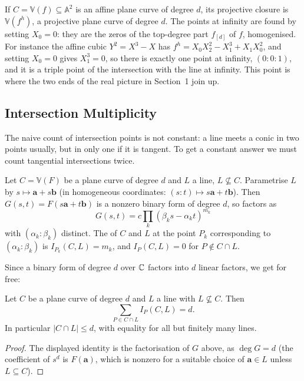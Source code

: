 \documentclass[a4paper]{scrartcl}
\newcommand{\A}{\mathbb{A}}
\newcommand{\V}{\mathbb{V}}
\begin{document}
\begin{example}
	If $C = \V(f) \subseteq \A^2$ is an affine plane curve of degree $d$, its projective closure is $\V(f^h)$, a projective plane curve of degree $d$. The points at infinity are found by setting $X_0 = 0$: they are the zeros of the top-degree part $f_{[d]}$ of $f$, homogenised. For instance the affine cubic $Y^2 = X^3 - X$ has $f^h = X_0X_2^2 - X_1^3 + X_1X_0^2$, and setting $X_0 = 0$ gives $X_1^3 = 0$, so there is exactly one point at infinity, $(0:0:1)$, and it is a triple point of the intersection with the line at infinity. This point is where the two ends of the real picture in Section~1 join up.
\end{example}

\subsection{Intersection Multiplicity}

The naive count of intersection points is not constant: a line meets a conic in two points usually, but in only one if it is tangent. To get a constant answer we must count tangential intersections twice.

\begin{definition}
	Let $C = \V(F)$ be a plane curve of degree $d$ and $L$ a line, $L \not\subseteq C$. Parametrise $L$ by $s \mapsto \mathbf a + s\mathbf b$ (in homogeneous coordinates: $(s:t)\mapsto s\mathbf a + t \mathbf b$). Then $G(s,t) = F(s\mathbf a + t\mathbf b)$ is a nonzero binary form of degree $d$, so factors as
	$$G(s,t) = c\prod_{k}(\beta_k s - \alpha_k t)^{m_k}$$
	with $(\alpha_k:\beta_k)$ distinct. The  of $C$ and $L$ at the point $P_k$ corresponding to $(\alpha_k : \beta_k)$ is $I_{P_k}(C,L) = m_k$, and $I_P(C,L) = 0$ for $P \notin C \cap L$.
\end{definition}

Since a binary form of degree $d$ over $\mathbb{C}$ factors into $d$ linear factors, we get for free:

\begin{proposition}\label{prop:bezoutline}
	Let $C$ be a plane curve of degree $d$ and $L$ a line with $L \not\subseteq C$. Then
	$$\sum_{P \in C\cap L} I_P(C,L) = d.$$
	In particular $|C \cap L| \leq d$, with equality for all but finitely many lines.
\end{proposition}

\begin{proof}
	The displayed identity is the factorisation of $G$ above, as $\deg G = d$ (the coefficient of $s^d$ is $F(\mathbf a)$, which is nonzero for a suitable choice of $\mathbf a \in L$ unless $L \subseteq C$).
\end{proof}
\end{document}
